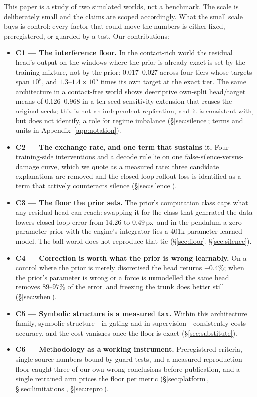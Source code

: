 \documentclass{article}
\begin{document}
This paper is a study of two simulated worlds, not a benchmark. The scale is deliberately small and the claims are scoped accordingly. What the small scale buys is control: every factor that could move the numbers is either fixed, preregistered, or guarded by a test. Our contributions:
\begin{itemize}
  \item \textbf{C1 --- The interference floor.} In the contact-rich world the residual head's output on the windows where the prior is already exact is set by the training mixture, not by the prior: $0.017$--$0.027$ across four tiers whose targets span $10^{5}$, and $1.3$--$1.4\times10^{5}$ times its own target at the exact tier. The same architecture in a contact-free world shows descriptive own-split head/target means of $0.126$--$0.968$ in a ten-seed sensitivity extension that reuses the original seeds; this is not an independent replication, and it is consistent with, but does not identify, a role for regime imbalance (\S\ref{sec:silence}; terms and units in Appendix~\ref{app:notation}).
  \item \textbf{C2 --- The exchange rate, and one term that sustains it.} Four training-side interventions and a decode rule lie on one false-silence-versus-damage curve, which we quote as a measured rate; three candidate explanations are removed and the closed-loop rollout loss is identified as a term that actively counteracts silence (\S\ref{sec:silence}).
  \item \textbf{C3 --- The floor the prior sets.} The prior's computation class caps what any residual head can reach: swapping it for the class that generated the data lowers closed-loop error from $14.26$ to $0.49$\,px, and in the pendulum a zero-parameter prior with the engine's integrator ties a 401k-parameter learned model. The ball world does not reproduce that tie (\S\ref{sec:floor}, \S\ref{sec:silence}).
  \item \textbf{C4 --- Correction is worth what the prior is wrong learnably.} On a control where the prior is merely discretised the head returns $-0.4\%$; when the prior's parameter is wrong or a force is unmodelled the same head removes $89$--$97\%$ of the error, and freezing the trunk does better still (\S\ref{sec:when}).
  \item \textbf{C5 --- Symbolic structure is a measured tax.} Within this architecture family, symbolic structure---in gating and in supervision---consistently costs accuracy, and the cost vanishes once the floor is exact (\S\ref{sec:substitute}).
  \item \textbf{C6 --- Methodology as a working instrument.} Preregistered criteria, single-source numbers bound by guard tests, and a measured reproduction floor caught three of our own wrong conclusions before publication, and a single retrained arm prices the floor per metric (\S\ref{sec:platform}, \S\ref{sec:limitations}, \S\ref{sec:repro}).
\end{itemize}
\end{document}
